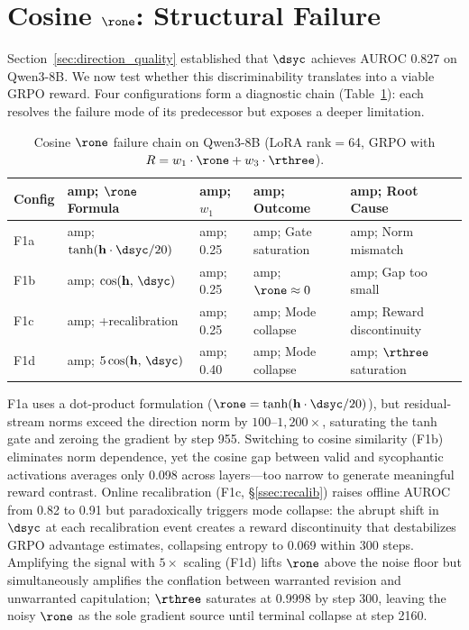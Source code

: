 \section{Cosine \texorpdfstring{$\rone$}{R1}: Structural Failure}
\label{sec:cosine_failure}

Section~\ref{sec:direction_quality} established that $\dsyc$ achieves AUROC 0.827 on Qwen3-8B.
We now test whether this discriminability translates into a viable GRPO reward.
Four configurations form a diagnostic chain (Table~\ref{tab:cosine_chain}): each resolves the failure mode of its predecessor but exposes a deeper limitation.

\begin{table}[t]
\centering
\caption{Cosine $\rone$ failure chain on Qwen3-8B (LoRA rank$=$64, GRPO with $R = w_1 \cdot \rone + w_3 \cdot \rthree$).}
\label{tab:cosine_chain}
\begin{tabular}{lllll}
\toprule
Config &amp; $\rone$ Formula &amp; $w_1$ &amp; Outcome &amp; Root Cause \\
\midrule
F1a &amp; $\tanh(\mathbf{h}\cdot\dsyc/20)$ &amp; 0.25 &amp; Gate saturation &amp; Norm mismatch \\
F1b &amp; $\cos(\mathbf{h},\, \dsyc)$ &amp; 0.25 &amp; $\rone \approx 0$ &amp; Gap too small \\
F1c &amp; +recalibration &amp; 0.25 &amp; Mode collapse &amp; Reward discontinuity \\
F1d &amp; $5\cos(\mathbf{h},\, \dsyc)$ &amp; 0.40 &amp; Mode collapse &amp; $\rthree$ saturation \\
\bottomrule
\end{tabular}
\end{table}

F1a uses a dot-product formulation ($\rone = \tanh(\mathbf{h} \cdot \dsyc / 20)$), but residual-stream norms exceed the direction norm by $100$--$1{,}200{\times}$, saturating the tanh gate and zeroing the gradient by step 955.
Switching to cosine similarity (F1b) eliminates norm dependence, yet the cosine gap between valid and sycophantic activations averages only 0.098 across layers---too narrow to generate meaningful reward contrast.
Online recalibration (F1c, \S\ref{ssec:recalib}) raises offline AUROC from 0.82 to 0.91 but paradoxically triggers mode collapse: the abrupt shift in $\dsyc$ at each recalibration event creates a reward discontinuity that destabilizes GRPO advantage estimates, collapsing entropy to 0.069 within 300 steps.
Amplifying the signal with $5{\times}$ scaling (F1d) lifts $\rone$ above the noise floor but simultaneously amplifies the conflation between warranted revision and unwarranted capitulation; $\rthree$ saturates at 0.9998 by step 300, leaving the noisy $\rone$ as the sole gradient source until terminal collapse at step 2160.

